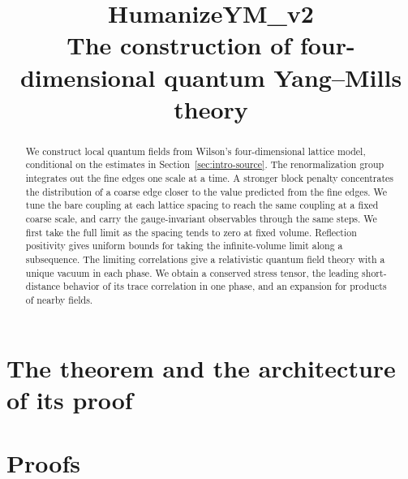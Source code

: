 \documentclass[11pt,letterpaper]{article}
\date{}
\title{HumanizeYM\_v2\\[0.45em]\large The construction of four-dimensional quantum Yang--Mills theory}
\author{}
\numberwithin{equation}{section}
\theoremstyle{plain}
\theoremstyle{definition}
\theoremstyle{remark}
\begin{document}
\maketitle
\begin{abstract}
We construct local quantum fields from Wilson's four-dimensional lattice model, conditional on the estimates in Section~\ref{sec:intro-source}. The renormalization group integrates out the fine edges one scale at a time. A stronger block penalty concentrates the distribution of a coarse edge closer to the value predicted from the fine edges. We tune the bare coupling at each lattice spacing to reach the same coupling at a fixed coarse scale, and carry the gauge-invariant observables through the same steps. We first take the full limit as the spacing tends to zero at fixed volume. Reflection positivity gives uniform bounds for taking the infinite-volume limit along a subsequence. The limiting correlations give a relativistic quantum field theory with a unique vacuum in each phase. We obtain a conserved stress tensor, the leading short-distance behavior of its trace correlation in one phase, and an expansion for products of nearby fields.
\end{abstract}
\tableofcontents

\part{The theorem and the architecture of its proof}











\part{Proofs}












{\small

}
\end{document}
